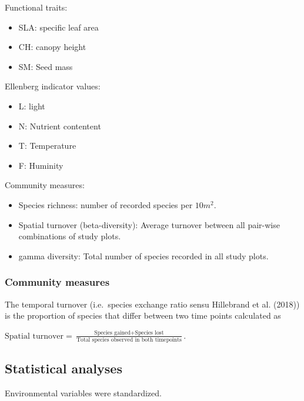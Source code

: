 \documentclass[fleqn,10pt,lineno]{wlpeerj} %
\providecommand{\tightlist}{
\setlength{\itemsep}{0pt}\setlength{\parskip}{0pt}}
\theoremstyle{definition}
\theoremstyle{definition}
\theoremstyle{definition}
\theoremstyle{remark}
\begin{document}
Functional traits:

\begin{itemize}
\tightlist
\item
  SLA: specific leaf area
\item
  CH: canopy height
\item
  SM: Seed mass
\end{itemize}

Ellenberg indicator values:

\begin{itemize}
\tightlist
\item
  L: light
\item
  N: Nutrient contentent
\item
  T: Temperature
\item
  F: Huminity
\end{itemize}

Community measures:

\begin{itemize}
\tightlist
\item
  Species richness: number of recorded species per \(10m^2\).
\item
  Spatial turnover (beta-diversity): Average turnover between all
  pair-wise combinations of study plots.
\item
  gamma diversity: Total number of species recorded in all study plots.
\end{itemize}

\subsubsection*{Community measures}\label{community-measures}

The temporal turnover (i.e.~species exchange ratio sensu Hillebrand et
al. (2018)) is the proportion of species that differ between two time
points calculated as

\(\text{Spatial turnover} = \frac{\text{Species gained} + \text{Species lost}}{\text{Total species observed in both timepoints}}\).

\subsection*{Statistical analyses}\label{statistical-analyses}

Environmental variables were standardized.
\end{document}
